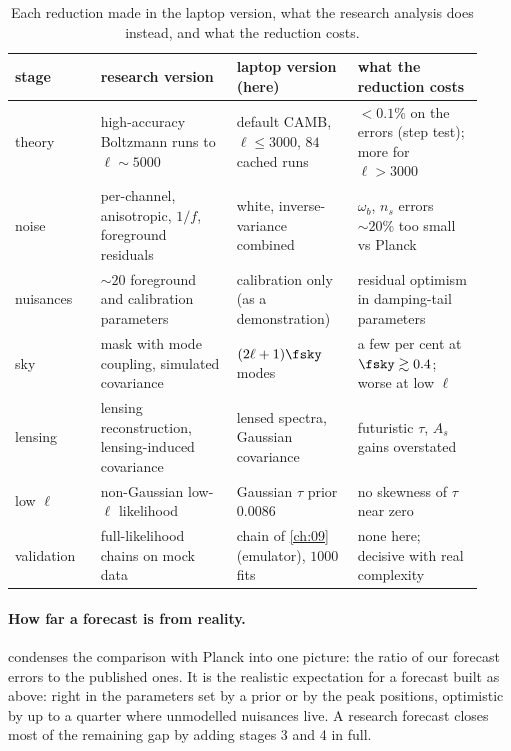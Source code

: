 \begin{table}[htbp]
\centering
\small
\renewcommand{\arraystretch}{1.2}
\begin{tabular}{@{}p{0.17\linewidth}p{0.27\linewidth}p{0.24\linewidth}p{0.25\linewidth}@{}}
\toprule
stage & research version & laptop version (here) & what the reduction costs\\\midrule
theory & high-accuracy Boltzmann runs to $\ell\sim5000$ & default CAMB, $\ell\le3000$, $84$ cached runs & $<0.1\%$ on the errors (step test); more for $\ell>3000$\\
noise & per-channel, anisotropic, $1/f$, foreground residuals & white, inverse-variance combined & $\omega_b$, $n_s$ errors $\sim20\%$ too small vs Planck\\
nuisances & $\sim20$ foreground and calibration parameters & calibration only (as a demonstration) & residual optimism in damping-tail parameters\\
sky & mask with mode coupling, simulated covariance & $(2\ell+1)\fsky$ modes & a few per cent at $\fsky\gtrsim0.4$; worse at low $\ell$\\
lensing & lensing reconstruction, lensing-induced covariance & lensed spectra, Gaussian covariance & futuristic $\tau$, $A_s$ gains overstated\\
low $\ell$ & non-Gaussian low-$\ell$ likelihood & Gaussian $\tau$ prior $0.0086$ & no skewness of $\tau$ near zero\\
validation & full-likelihood chains on mock data & chain of \cref{ch:09} (emulator), $1000$ fits & none here; decisive with real complexity\\
\bottomrule
\end{tabular}
\caption{Each reduction made in the laptop version, what the research analysis does instead, and what the reduction costs.}
\label{10a:tab:laptop}
\end{table}

\paragraph{How far a forecast is from reality.}  condenses the comparison with Planck into one
picture: the ratio of our forecast errors to the published ones. It is the realistic expectation for a forecast
built as above: right in the parameters set by a prior or by the peak positions, optimistic by up to a
quarter where unmodelled nuisances live. A research forecast closes most of the remaining gap by adding stages 3
and 4 in full.

